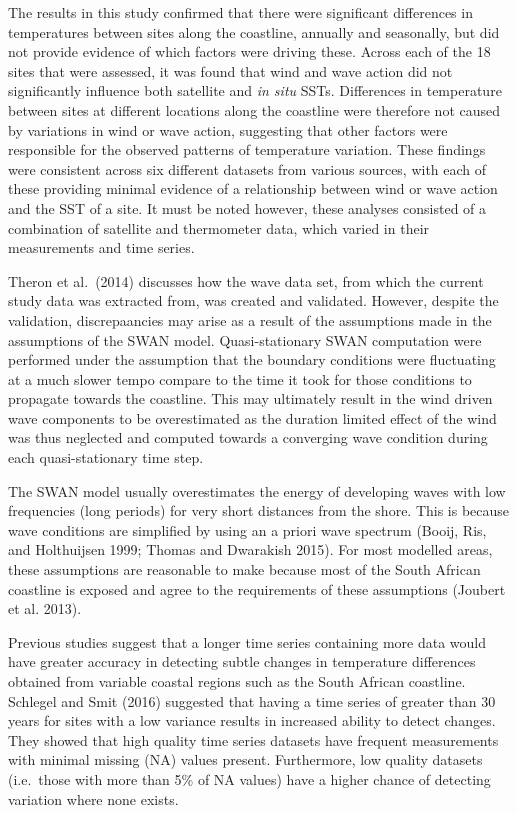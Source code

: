 \documentclass[12pt,a4paper,]{article}
\begin{document}
The results in this study confirmed that there were significant
differences in temperatures between sites along the coastline, annually
and seasonally, but did not provide evidence of which factors were
driving these. Across each of the 18 sites that were assessed, it was
found that wind and wave action did not significantly influence both
satellite and \emph{in situ} SSTs. Differences in temperature between
sites at different locations along the coastline were therefore not
caused by variations in wind or wave action, suggesting that other
factors were responsible for the observed patterns of temperature
variation. These findings were consistent across six different datasets
from various sources, with each of these providing minimal evidence of a
relationship between wind or wave action and the SST of a site. It must
be noted however, these analyses consisted of a combination of satellite
and thermometer data, which varied in their measurements and time
series.

Theron et al.~(2014) discusses how the wave data set, from which the
current study data was extracted from, was created and validated.
However, despite the validation, discrepaancies may arise as a result of
the assumptions made in the assumptions of the SWAN model.
Quasi-stationary SWAN computation were performed under the assumption
that the boundary conditions were fluctuating at a much slower tempo
compare to the time it took for those conditions to propagate towards
the coastline. This may ultimately result in the wind driven wave
components to be overestimated as the duration limited effect of the
wind was thus neglected and computed towards a converging wave condition
during each quasi-stationary time step.

The SWAN model usually overestimates the energy of developing waves with
low frequencies (long periods) for very short distances from the shore.
This is because wave conditions are simplified by using an a priori wave
spectrum (Booij, Ris, and Holthuijsen 1999; Thomas and Dwarakish 2015).
For most modelled areas, these assumptions are reasonable to make
because most of the South African coastline is exposed and agree to the
requirements of these assumptions (Joubert et al. 2013).

Previous studies suggest that a longer time series containing more data
would have greater accuracy in detecting subtle changes in temperature
differences obtained from variable coastal regions such as the South
African coastline. Schlegel and Smit (2016) suggested that having a time
series of greater than 30 years for sites with a low variance results in
increased ability to detect changes. They showed that high quality time
series datasets have frequent measurements with minimal missing (NA)
values present. Furthermore, low quality datasets (i.e.~those with more
than 5\% of NA values) have a higher chance of detecting variation where
none exists.
\end{document}
